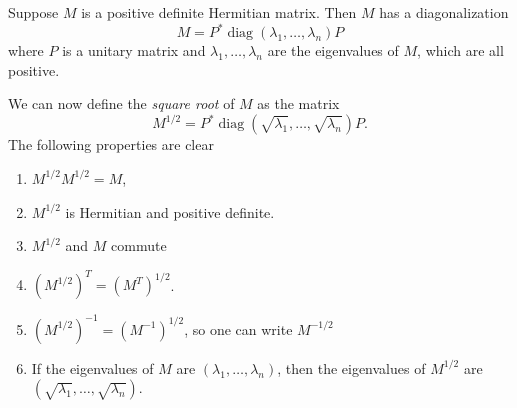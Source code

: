 \documentclass[12pt]{article}
\begin{document}
Suppose $M$ is a positive definite Hermitian matrix. Then $M$ has a diagonalization 
$$
   M= P^* \operatorname{diag}(\lambda_1, \ldots, \lambda_n) P
$$
where $P$ is a unitary matrix and 
   $\lambda_1, \ldots, \lambda_n$ are the eigenvalues of $M$, which are all positive. 

We can now define the \emph{squar{e} roo{t}} of $M$ as the matrix
$$
   M^{1/2}= P^* \operatorname{diag}(\sqrt{\lambda_1}, \ldots, \sqrt{\lambda_n}) P.
$$
The following properties are clear
\begin{enumerate}
\item $M^{1/2} M^{1/2}=M$,
\item $M^{1/2}$ is Hermitian and positive definite.
\item $M^{1/2}$ and $M$ commute
\item $(M^{1/2})^T=(M^T)^{1/2}$.
\item $(M^{1/2})^{-1}=(M^{-1})^{1/2}$, so one can write $M^{-1/2}$
\item If the eigenvalues of $M$ are $(\lambda_1, \ldots, \lambda_n)$, then
    the eigenvalues of $M^{1/2}$ are 
    $(\sqrt{\lambda_1}, \ldots, \sqrt{\lambda_n})$.
\end{enumerate}
\end{document}
